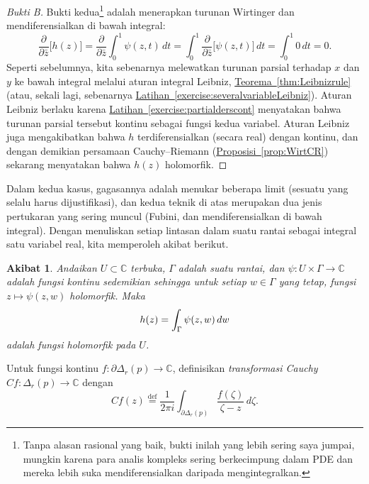 \documentclass[12pt,openany]{book}
\newcommand{\avoidbreak}{\postdisplaypenalty=100}
\newcommand{\C}{{\mathbb{C}}}
\newcommand{\myindex}[1]{#1\index{#1}}
\theoremstyle{plain}
\newtheorem{cor}[thm]{Akibat}
\theoremstyle{remark}
\theoremstyle{definition}
\theoremstyle{exercise}
\theoremstyle{example}
\newcommand{\exerciseref}[1]{\hyperref[#1]{Latihan~\ref*{#1}}}
\newcommand{\thmref}[1]{\hyperref[#1]{Teorema~\ref*{#1}}}
\newcommand{\propref}[1]{\hyperref[#1]{Proposisi~\ref*{#1}}}
\begin{document}
\begin{proof}[Bukti B]
Bukti kedua\footnote{%
Tanpa alasan rasional yang baik, bukti inilah yang lebih sering saya jumpai,
mungkin karena para analis kompleks sering berkecimpung dalam PDE
dan mereka lebih suka mendiferensialkan daripada mengintegralkan.}
adalah menerapkan turunan Wirtinger dan mendiferensialkan di bawah integral:
\begin{equation*}
\frac{\partial}{\partial \bar{z}}
\bigl[
h(z)
\bigr]
=
\frac{\partial}{\partial \bar{z}}
\int_0^1 \psi(z,t) \, dt
=
\int_0^1
\frac{\partial}{\partial \bar{z}}
\bigl[
\psi(z,t)
\bigr]
\, dt
= \int_0^1 0 \, dt = 0.
\end{equation*}
Seperti sebelumnya, kita sebenarnya melewatkan turunan parsial terhadap $x$
dan $y$ ke bawah integral melalui aturan integral Leibniz,
\thmref{thm:Leibnizrule} (atau, sekali lagi, sebenarnya
\exerciseref{exercise:severalvariableLeibniz}).
Aturan Leibniz berlaku karena 
\exerciseref{exercise:partialderscont} menyatakan bahwa turunan
parsial tersebut kontinu sebagai fungsi kedua variabel.
Aturan Leibniz juga mengakibatkan bahwa $h$ terdiferensialkan (secara real) dengan kontinu,
dan dengan demikian
persamaan Cauchy--Riemann
(\propref{prop:WirtCR}) sekarang
menyatakan bahwa $h(z)$ holomorfik.
\end{proof}

Dalam kedua kasus, gagasannya adalah menukar beberapa limit (sesuatu yang selalu harus
dijustifikasi),
dan kedua teknik di atas merupakan dua jenis pertukaran yang sering muncul
(Fubini, dan mendiferensialkan di bawah integral).  Dengan menuliskan setiap
lintasan dalam suatu rantai sebagai integral satu variabel real, kita memperoleh
akibat berikut.

\begin{cor} \label{cor:holfuncbyintegral}
Andaikan $U \subset \C$ terbuka, $\Gamma$ adalah suatu 
rantai,
dan
$\psi \colon U \times \Gamma \to \C$ adalah fungsi kontinu sedemikian sehingga
untuk setiap $w \in \Gamma$ yang tetap, fungsi $z \mapsto \psi(z,w)$
holomorfik.  Maka
\begin{equation*}
h(z) =
\int_\Gamma \psi(z,w) \, dw
\avoidbreak
\end{equation*}
adalah fungsi holomorfik pada $U$.
\end{cor}

Untuk fungsi kontinu $f \colon \partial \Delta_r(p) \to \C$, definisikan
\emph{\myindex{transformasi Cauchy}} $Cf \colon \Delta_r(p) \to \C$ dengan
%
\begin{equation*}
Cf(z)
\overset{\text{def}}{=}
\frac{1}{2\pi i}
\int_{\partial \Delta_r(p)}
\frac{f(\zeta)}{\zeta-z}\, d\zeta .
\end{equation*}
\end{document}
